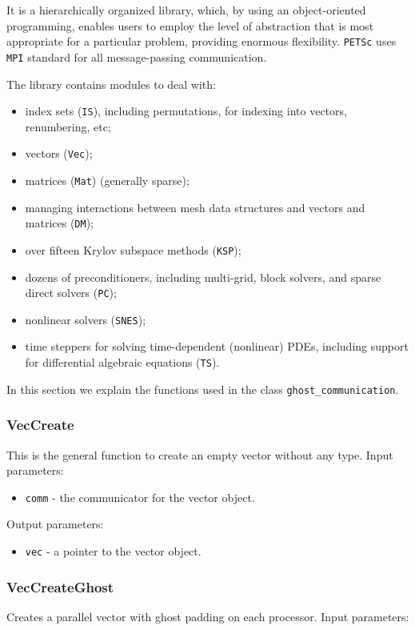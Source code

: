 It is a hierarchically organized library, which, by using an object-oriented programming, enables users  to employ the level of abstraction that is most appropriate for a particular problem, providing enormous flexibility. \verb|PETSc| uses \verb|MPI| standard for all message-passing communication.

The library contains modules to deal with:

\begin{itemize}
\item index sets (\verb|IS|), including permutations, for indexing into vectors, renumbering, etc;
\item vectors (\verb|Vec|);
\item matrices (\verb|Mat|) (generally sparse);
\item managing interactions between mesh data structures and vectors and matrices (\verb|DM|);
\item over fifteen Krylov subspace methods (\verb|KSP|);
\item dozens of preconditioners, including multi-grid, block solvers, and sparse direct solvers (\verb|PC|);
\item nonlinear solvers (\verb|SNES|);
\item time steppers for solving time-dependent (nonlinear) PDEs, including support for differential algebraic equations (\verb|TS|).
\end{itemize}

In this section we explain the functions used in the class \verb|ghost_communication|.

\subsubsection{VecCreate}\label{subsubsection:VecCreate}
This is the general function to create an empty vector without any type. Input parameters:

\begin{itemize}
\item \verb|comm| - the communicator for the vector object.
\end{itemize}
Output parameters:
\begin{itemize}
\item \verb|vec| - a pointer to the vector object.
\end{itemize}

\subsubsection{VecCreateGhost}\label{subsubsection:VecCreateGhost}
Creates a parallel vector with ghost padding on each processor. Input parameters:

